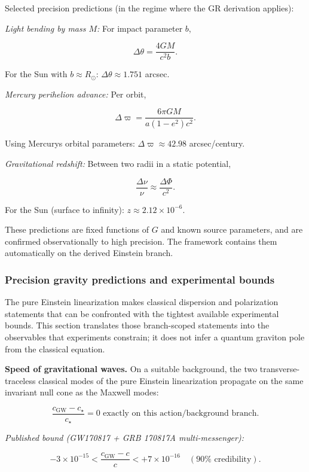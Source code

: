 Selected precision predictions (in the regime where the GR derivation applies):

\emph{Light bending by mass \(M\):} For impact parameter \(b\),

\[
\Delta\theta = \frac{4GM}{c^2 b}.
\]

For the Sun with \(b \approx R_\odot\): \(\Delta\theta \approx 1.751\) arcsec.

\emph{Mercury perihelion advance:} Per orbit,

\[
\Delta\varpi = \frac{6\pi GM}{a(1-e^2)c^2}.
\]

Using Mercury\textquotesingle s orbital parameters: \(\Delta\varpi \approx 42.98\) arcsec/century.

\emph{Gravitational redshift:} Between two radii in a static potential,

\[
\frac{\Delta\nu}{\nu} \approx \frac{\Delta\Phi}{c^2}.
\]

For the Sun (surface to infinity): \(z \approx 2.12 \times 10^{-6}\).

These predictions are fixed functions of \(G\) and known source parameters, and are confirmed observationally to high precision. The framework contains them automatically on the derived Einstein branch.

\subsubsection{Precision gravity predictions and experimental bounds}\label{513-precision-gravity-predictions-and-experimental-bounds}

The pure Einstein linearization makes classical dispersion and polarization statements that can be
confronted with the tightest available experimental bounds. This section translates those
branch-scoped statements into the observables that experiments constrain; it does not infer a
quantum graviton pole from the classical equation.

\textbf{Speed of gravitational waves.} On a suitable background, the two transverse-traceless
classical modes of the pure Einstein linearization propagate on the same invariant null cone as
the Maxwell modes:

\[
\frac{c_{\mathrm{GW}} - c_\star}{c_\star} = 0 \text{ exactly on this action/background branch.}
\]

\emph{Published bound (GW170817 + GRB 170817A multi-messenger):}

\[
-3 \times 10^{-15} < \frac{c_{\mathrm{GW}} - c}{c} < +7 \times 10^{-16}
\quad (90\% \text{ credibility}).
\]

